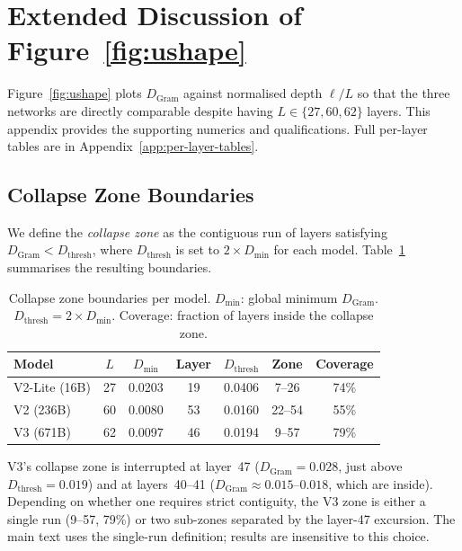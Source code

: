 %

\section{Extended Discussion of Figure~\ref{fig:ushape}}
\label{app:ushape}

Figure~\ref{fig:ushape} plots $D_\text{Gram}$ against normalised depth
$\ell / L$ so that the three networks are directly comparable despite having
$L \in \{27, 60, 62\}$ layers.
This appendix provides the supporting numerics and qualifications.
Full per-layer tables are in Appendix~\ref{app:per-layer-tables}.

\subsection{Collapse Zone Boundaries}
\label{app:collapse-zones}

We define the \emph{collapse zone} as the contiguous run of layers satisfying
$D_\text{Gram} < D_\text{thresh}$, where $D_\text{thresh}$ is set to
$2 \times D_\text{min}$ for each model.
Table~\ref{tab:collapse-zones} summarises the resulting boundaries.

\begin{table}[h]
\centering
\caption{Collapse zone boundaries per model.
  $D_\text{min}$: global minimum $D_\text{Gram}$.
  $D_\text{thresh} = 2 \times D_\text{min}$.
  Coverage: fraction of layers inside the collapse zone.}
\label{tab:collapse-zones}
\begin{tabular}{lcccccc}
\toprule
Model & $L$ & $D_\text{min}$ & Layer & $D_\text{thresh}$ & Zone & Coverage \\
\midrule
V2-Lite (16B) & 27 & 0.0203 & 19 & 0.0406 & 7--26 & 74\% \\
V2     (236B) & 60 & 0.0080 & 53 & 0.0160 & 22--54 & 55\% \\
V3     (671B) & 62 & 0.0097 & 46 & 0.0194 & 9--57  & 79\% \\
\bottomrule
\end{tabular}
\end{table}

\noindent
V3's collapse zone is interrupted at layer~47
($D_\text{Gram} = 0.028$, just above $D_\text{thresh} = 0.019$) and at
layers~40--41 ($D_\text{Gram} \approx 0.015$--$0.018$, which are inside).
Depending on whether one requires strict contiguity, the V3 zone is either
a single run (9--57, 79\%) or two sub-zones separated by the layer-47
excursion.
The main text uses the single-run definition; results are insensitive to
this choice.

